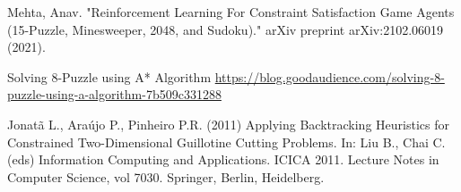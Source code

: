 \documentclass{svproc}
\begin{document}
\begin{thebibliography}{6}
Mehta, Anav. "Reinforcement Learning For Constraint Satisfaction Game Agents (15-Puzzle, Minesweeper, 2048, and Sudoku)." arXiv preprint arXiv:2102.06019 (2021).

Solving 8-Puzzle using A* Algorithm
\url{https://blog.goodaudience.com/solving-8-puzzle-using-a-algorithm-7b509c331288}

Jonatã L., Araújo P., Pinheiro P.R. (2011) Applying Backtracking Heuristics for Constrained Two-Dimensional Guillotine Cutting Problems. In: Liu B., Chai C. (eds) Information Computing and Applications. ICICA 2011. Lecture Notes in Computer Science, vol 7030. Springer, Berlin, Heidelberg.

\end{thebibliography}
\end{document}
